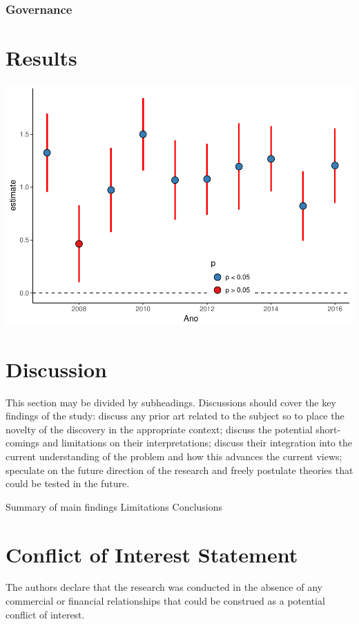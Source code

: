 \documentclass{frontiersSCNS}
\begin{document}
\subsubsection{Governance}\label{governance}

\section{Results}\label{results}

\includegraphics{Villasenor-Derbez_files/figure-latex/unnamed-chunk-3-1.pdf}

\section{Discussion}\label{discussion}

This section may be divided by subheadings. Discussions should cover the
key findings of the study: discuss any prior art related to the subject
so to place the novelty of the discovery in the appropriate context;
discuss the potential short-comings and limitations on their
interpretations; discuss their integration into the current
understanding of the problem and how this advances the current views;
speculate on the future direction of the research and freely postulate
theories that could be tested in the future.

Summary of main findings Limitations Conclusions

\section*{Conflict of Interest Statement}

The authors declare that the research was conducted in the absence of
any commercial or financial relationships that could be construed as a
potential conflict of interest.
\end{document}
